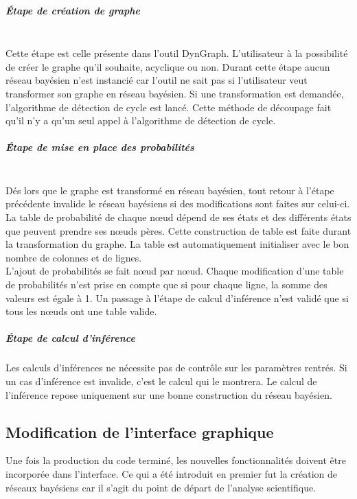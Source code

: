 \documentclass[conference]{IEEEtran}
\begin{document}
\subparagraph{Étape de création de graphe \hfill} \\
Cette étape est celle présente dans l'outil DynGraph. L'utilisateur à la possibilité de créer le graphe qu'il souhaite, acyclique ou non. Durant cette étape aucun réseau bayésien n'est instancié car  l'outil ne sait pas si l'utilisateur veut transformer son graphe en réseau bayésien. Si une transformation est demandée, l'algorithme de détection de cycle est lancé. Cette méthode de découpage fait qu'il n'y a qu'un seul appel à l'algorithme de détection de cycle. \\

\subparagraph{Étape de mise en place des probabilités \hfill}
\\
Dés lors que le graphe est transformé en réseau bayésien, tout retour à l'étape précédente invalide le réseau bayésiens si des modifications sont faites sur celui-ci. La table de probabilité de chaque nœud dépend de ses états et des différents états que peuvent prendre ses nœuds pères. Cette construction de table est faite durant la transformation du graphe. La table est automatiquement initialiser avec le bon nombre de colonnes et de lignes. \\
L'ajout de probabilités se fait nœud par nœud. Chaque modification d'une table de probabilités n'est prise en compte que si pour chaque ligne, la somme des valeurs est égale à 1. 
Un passage à l'étape de calcul d'inférence n'est validé que si tous les nœuds ont une table valide. \\

\subparagraph{Étape de calcul d'inférence}
Les calculs d'inférences ne nécessite pas de contrôle sur les paramètres rentrés. Si un cas d'inférence est invalide, c'est le calcul qui le montrera. Le calcul de l'inférence repose uniquement sur une bonne construction du réseau bayésien. 


\subsection{Modification de l'interface graphique }

Une fois la production du code terminé, les nouvelles fonctionnalités doivent être incorporée dans l'interface. Ce qui a été introduit en premier fut la création de réseaux bayésiens car il s'agit du point de départ de l'analyse scientifique.
\end{document}
